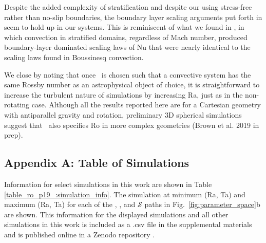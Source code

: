 Despite the added complexity of stratification and despite our using stress-free rather than
no-slip boundaries, the boundary layer scaling arguments put forth in \cite{king&all2012} seem
to hold up in our systems. This is reminiscent of what we found in \AB, in which
convection in stratified domains, regardless of Mach number, produced boundary-layer
dominated scaling laws of Nu that were nearly identical to the scaling laws found in
Boussinesq \RB convection.

We close by noting that once \pro$\,$ is chosen such that a convective system has the same
Rossby number as an astrophysical object of choice, it is straightforward to increase the 
turbulent nature of 
simulations by increasing Ra, just as in the non-rotating case.
Although all the results reported here are for a Cartesian geometry with 
antiparallel gravity and rotation, preliminary 3D spherical simulations suggest that 
\pro$\,$ also specifies Ro in more complex geometries (Brown et al. 2019 in prep).


\subsection{Appendix A: Table of Simulations}
\label{appendix_ro_p19_:table}
Information for select simulations in this work are shown in Table \ref{table_ro_p19_:simulation_info}.
The simulation at minimum (Ra, Ta) and maximum (Ra, Ta) for each of the \pro, \con, and $\mathcal{S}$
paths in Fig.~\ref{fig:parameter_space}b are shown. This information for the displayed simulations
and all other simulations in this work is included as a .csv file in the supplemental materials
and is published online in a Zenodo repository \citep{supp_andersetall2019a}.


